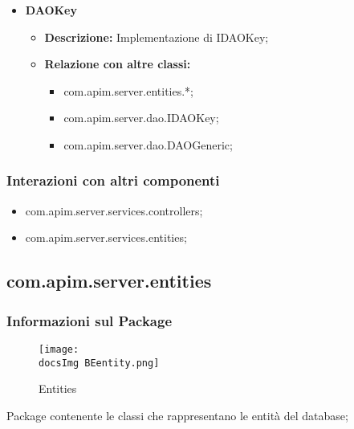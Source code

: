 {{{{{\begin{itemize}
\begin{itemize}
            \begin{itemize}
              \item com.apim.server.dao.DAOFactory;
            \end{itemize}
          \end{itemize}
          \item \textbf{DAOKey}
          \begin{itemize}
            \item \textbf{Descrizione:} Implementazione di IDAOKey;
            \item \textbf{Relazione con altre classi:}
            \begin{itemize}
              \item com.apim.server.entities.*;
              \item com.apim.server.dao.IDAOKey;
              \item com.apim.server.dao.DAOGeneric;
            \end{itemize}
          \end{itemize}
       \end{itemize}
       \subsubsection{Interazioni con altri componenti}
          \begin{itemize}
            \item com.apim.server.services.controllers;
            \item com.apim.server.services.entities;
          \end{itemize}
          
          
          \subsection{com.apim.server.entities}{
    \subsubsection{Informazioni sul Package}
        \begin{figure}[H]
          \centering
          \texttt{[image: \\docsImg BEentity.png]}
          \caption{Entities}
          \label{Entities}
        \end{figure}
       Package contenente le classi che rappresentano le entità del database;
}}}}}}
